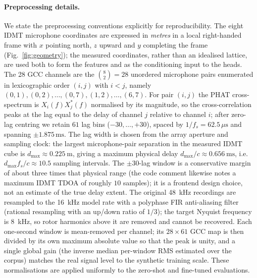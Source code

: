 \documentclass[5p,twocolumn]{elsarticle}
\begin{document}
\paragraph{Preprocessing details.}
We state the preprocessing conventions explicitly for reproducibility. The eight IDMT microphone coordinates are expressed in \emph{metres} in a local right-handed frame with $x$ pointing north, $z$ upward and $y$ completing the frame (Fig.~\ref{fig:geometry}); the measured coordinates, rather than an idealised lattice, are used both to form the features and as the conditioning input to the heads. The 28 GCC channels are the $\binom{8}{2}=28$ unordered microphone pairs enumerated in lexicographic order $(i,j)$ with $i<j$, namely $(0,1),(0,2),\ldots,(0,7),(1,2),\ldots,(6,7)$. For pair $(i,j)$ the PHAT cross-spectrum is $X_i(f)X_j^{*}(f)$ normalised by its magnitude, so the cross-correlation peaks at the lag equal to the delay of channel $j$ relative to channel $i$; after zero-lag centring we retain $61$ lag bins ($-30,\ldots,+30$), spaced by $1/f_s=62.5\,\mu\mathrm{s}$ and spanning $\pm1.875\,\mathrm{ms}$. The lag width is chosen from the array aperture and sampling clock: the largest microphone-pair separation in the measured IDMT cube is $d_{\max}\approx\SI{0.225}{\meter}$, giving a maximum physical delay $d_{\max}/c\approx\SI{0.656}{\milli\second}$, i.e.\ $d_{\max}f_s/c\approx10.5$ sampling intervals. The $\pm30$-lag window is a conservative margin of about three times that physical range (the code comment likewise notes a maximum IDMT TDOA of roughly $10$ samples); it is a frontend design choice, not an estimate of the true delay extent. The original \SI{48}{\kilo\hertz} recordings are resampled to the \SI{16}{\kilo\hertz} model rate with a polyphase FIR anti-aliasing filter (rational resampling with an up/down ratio of $1/3$); the target Nyquist frequency is \SI{8}{\kilo\hertz}, so rotor harmonics above it are removed and cannot be recovered. Each one-second window is mean-removed per channel; its $28\times61$ GCC map is then divided by its own maximum absolute value so that the peak is unity, and a single global gain (the inverse median per-window RMS estimated over the corpus) matches the real signal level to the synthetic training scale. These normalisations are applied uniformly to the zero-shot and fine-tuned evaluations.
\end{document}
